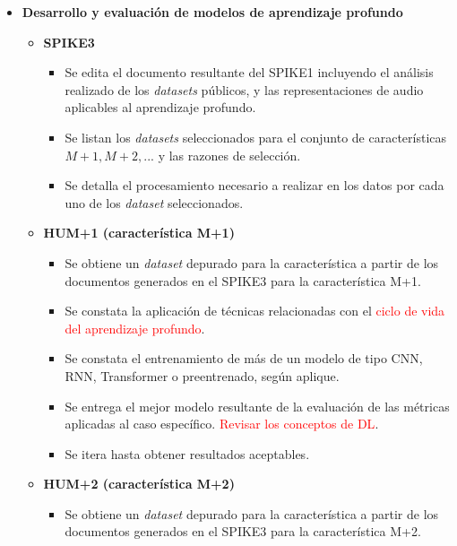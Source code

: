 \documentclass[
11pt, %
]{charter}
\begin{document}
\begin{itemize}
  \item \textbf{Desarrollo y evaluación de modelos de aprendizaje profundo}
    \begin{itemize}
      \item \textbf{SPIKE3}
        \begin{itemize}
          \item Se edita el documento resultante del SPIKE1 incluyendo el análisis realizado de los \textit{datasets} públicos, y las representaciones de audio aplicables al aprendizaje profundo.
          \item Se listan los \textit{datasets} seleccionados para el conjunto de características ${M+1, M+2, ...}$ y las razones de selección.
          \item Se detalla el procesamiento necesario a realizar en los datos por cada uno de los \textit{dataset} seleccionados.
        \end{itemize}
      \item \textbf{HUM+1 (característica M+1)}
      \begin{itemize}
        \item Se obtiene un \textit{dataset} depurado para la característica a partir de los documentos generados en el SPIKE3 para la característica M+1.  
        \item Se constata la aplicación de técnicas relacionadas con el \textcolor{red}{ciclo de vida del aprendizaje profundo}. 
        \item Se constata el entrenamiento de más de un modelo de tipo CNN, RNN, Transformer o preentrenado, según aplique.
        \item Se entrega el mejor modelo resultante de la evaluación de las métricas aplicadas al caso específico. \textcolor{red}{Revisar los conceptos de DL}.
        \item Se itera hasta obtener resultados aceptables.
      \end{itemize}
      \item \textbf{HUM+2 (característica M+2)}
      \begin{itemize}
        \item Se obtiene un \textit{dataset} depurado para la característica a partir de los documentos generados en el SPIKE3 para la característica M+2.  

\end{itemize}
\end{itemize}
\end{itemize}
\end{document}
